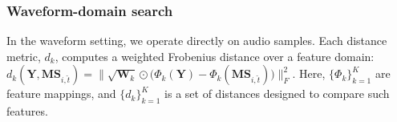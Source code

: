 \documentclass{article}
\begin{document}



\vspace{-5pt}
\subsubsection{Waveform-domain search}
\vspace{-3pt}

In the waveform setting, we 
operate directly on audio samples. 
Each distance metric, $d_k$, computes a weighted Frobenius distance over a feature domain:
$d_k(\mathbf{Y},\mathbf{M} \mathbf{S}_{i,\hat{t}}) = \big\| \sqrt{\mathbf{W}_k} \odot \big( \Phi_k(\mathbf{Y}) - \Phi_k(\mathbf{M} \mathbf{S}_{i,\hat{t}}) \big) \big\|^2_F$. 
Here, $\{\Phi_k\}_{k=1}^K$ are feature mappings, and $\{d_k\}_{k=1}^K$ is a set of distances designed to compare such features.
\end{document}
